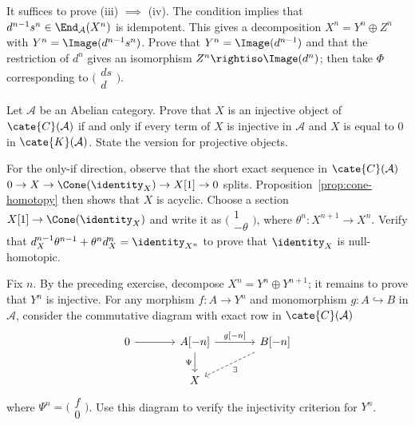 \begin{Exercises}
	\begin{hint}
		It suffices to prove (iii) $\implies$ (iv). The condition implies that
		$d^{n-1}s^n\in\End_{\mathcal{A}}(X^n)$ is idempotent. This gives a
		decomposition $X^n=Y^n\oplus Z^n$ with
		$Y^n=\Image(d^{n-1}s^n)$. Prove that
		$Y^n=\Image(d^{n-1})$ and that the restriction of $d^n$ gives an
		isomorphism $Z^n\rightiso\Image(d^n)$; then take $\Phi$ corresponding
		to $\bigl(\begin{smallmatrix}ds\\d\end{smallmatrix}\bigr)$.
	\end{hint}

	\item Let $\mathcal{A}$ be an Abelian category. Prove that $X$ is an
	injective object of $\cate{C}(\mathcal{A})$ if and only if every term of
	$X$ is injective in $\mathcal{A}$ and $X$ is equal to $0$ in
	$\cate{K}(\mathcal{A})$. State the version for projective objects.

	\begin{hint}
		For the only-if direction, observe that the short exact sequence in
		$\cate{C}(\mathcal{A})$
		$0\to X\to\Cone(\identity_X)\to X[1]\to0$ splits.
		Proposition~\ref{prop:cone-homotopy} then shows that $X$ is acyclic.
		Choose a section $X[1]\to\Cone(\identity_X)$ and write it as
		$\bigl(\begin{smallmatrix}1\\-\theta\end{smallmatrix}\bigr)$, where
		$\theta^n:X^{n+1}\to X^n$. Verify that
		$d_X^{n-1}\theta^{n-1}+\theta^nd_X^n=\identity_{X^n}$ to prove that
		$\identity_X$ is null-homotopic.

		Fix $n$. By the preceding exercise, decompose
		$X^n=Y^n\oplus Y^{n+1}$; it remains to prove that $Y^n$ is injective.
		For any morphism $f:A\to Y^n$ and monomorphism
		$g:A\hookrightarrow B$ in $\mathcal{A}$, consider the commutative
		diagram with exact row in $\cate{C}(\mathcal{A})$
		\[
		\begin{tikzcd}[column sep=large]
			0 \arrow[r] &
			{A[-n]} \arrow[r, "{g[-n]}"] \arrow[d, "\Psi"'] &
			{B[-n]} \arrow[dashed, ld, "\exists"] \\
			& X &
		\end{tikzcd}
		\]
		where $\Psi^n=\bigl(\begin{smallmatrix}f\\0\end{smallmatrix}\bigr)$.
		Use this diagram to verify the injectivity criterion for $Y^n$.


\end{hint}
\end{Exercises}
